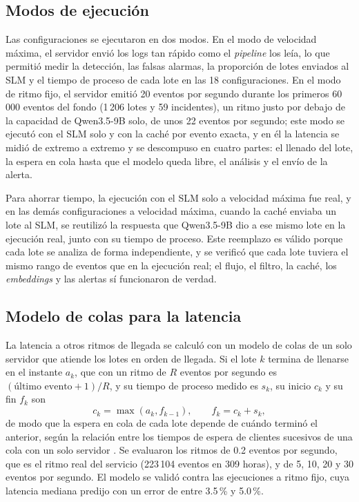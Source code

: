 \subsection{Modos de ejecución}

Las configuraciones se ejecutaron en dos modos. En el modo de velocidad máxima, el servidor envió los logs tan rápido como el \textit{pipeline} los leía, lo que permitió medir la detección, las falsas alarmas, la proporción de lotes enviados al SLM y el tiempo de proceso de cada lote en las 18 configuraciones. En el modo de ritmo fijo, el servidor emitió 20 eventos por segundo durante los primeros 60\,000 eventos del fondo (1\,206 lotes y 59 incidentes), un ritmo justo por debajo de la capacidad de Qwen3.5-9B solo, de unos 22 eventos por segundo; este modo se ejecutó con el SLM solo y con la caché por evento exacta, y en él la latencia se midió de extremo a extremo y se descompuso en cuatro partes: el llenado del lote, la espera en cola hasta que el modelo queda libre, el análisis y el envío de la alerta.

Para ahorrar tiempo, la ejecución con el SLM solo a velocidad máxima fue real, y en las demás configuraciones a velocidad máxima, cuando la caché enviaba un lote al SLM, se reutilizó la respuesta que Qwen3.5-9B dio a ese mismo lote en la ejecución real, junto con su tiempo de proceso. Este reemplazo es válido porque cada lote se analiza de forma independiente, y se verificó que cada lote tuviera el mismo rango de eventos que en la ejecución real; el flujo, el filtro, la caché, los \textit{embeddings} y las alertas sí funcionaron de verdad.

\subsection{Modelo de colas para la latencia}

La latencia a otros ritmos de llegada se calculó con un modelo de colas de un solo servidor que atiende los lotes en orden de llegada. Si el lote $k$ termina de llenarse en el instante $a_k$, que con un ritmo de $R$ eventos por segundo es $(\text{último evento} + 1)/R$, y su tiempo de proceso medido es $s_k$, su inicio $c_k$ y su fin $f_k$ son
\begin{equation}
c_k = \max(a_k, f_{k-1}), \qquad f_k = c_k + s_k,
\end{equation}
de modo que la espera en cola de cada lote depende de cuándo terminó el anterior, según la relación entre los tiempos de espera de clientes sucesivos de una cola con un solo servidor \cite{lindley1952_queues}. Se evaluaron los ritmos de 0.2 eventos por segundo, que es el ritmo real del servicio (223\,104 eventos en 309 horas), y de 5, 10, 20 y 30 eventos por segundo. El modelo se validó contra las ejecuciones a ritmo fijo, cuya latencia mediana predijo con un error de entre 3.5\,\% y 5.0\,\%.

